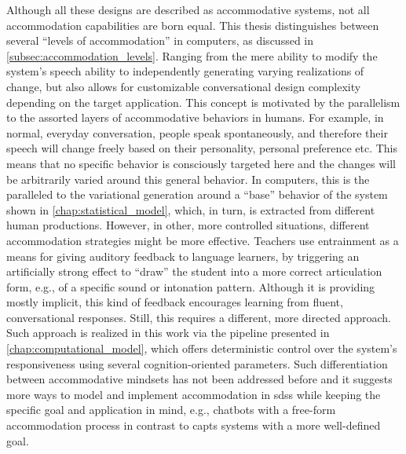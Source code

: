 Although all these designs are described as accommodative systems, not all accommodation capabilities are born equal.
This thesis distinguishes between several \enquote{levels of accommodation} in computers, as discussed in \cref{subsec:accommodation_levels}.
Ranging from the mere ability to modify the system's speech ability to independently generating varying realizations of change, but also allows for customizable conversational design complexity depending on the target application.
This concept is motivated by the parallelism to the assorted layers of accommodative behaviors in humans.
For example, in normal, everyday conversation, people speak spontaneously, and therefore their speech will change freely based on their personality, personal preference etc.
This means that no specific behavior is consciously targeted here and the changes will be arbitrarily varied around this general behavior.
In computers, this is the paralleled to the variational generation around a \enquote{base} behavior of the system shown in \cref{chap:statistical_model}, which, in turn, is extracted from different human productions.
However, in other, more controlled situations, different accommodation strategies might be more effective.
Teachers use entrainment as a means for giving auditory feedback to language learners, by triggering an artificially strong effect to \enquote{draw} the student into a more correct articulation form, e.g., of a specific sound or intonation pattern.
Although it is providing mostly implicit, this kind of feedback encourages learning from fluent, conversational responses.
Still, this requires a different, more directed approach.
Such approach is realized in this work via the pipeline presented in \cref{chap:computational_model}, which offers deterministic control over the system's responsiveness using several cognition-oriented parameters.
Such differentiation between accommodative mindsets has not been addressed before and it suggests more ways to model and implement accommodation in \acp{sds} while keeping the specific goal and application in mind, e.g., chatbots with a free-form accommodation process in contrast to \acp{capt} systems with a more well-defined goal.







